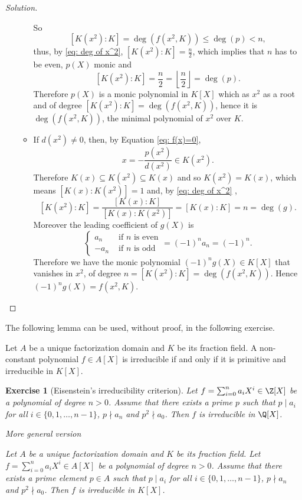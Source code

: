 \documentclass[a4paper,10pt,reqno]{amsart}
\newtheorem{ex}{Exercise}[section]
\newenvironment{sol}
  {\renewcommand\qedsymbol{$\blacksquare$}\begin{proof}[Solution]}
  {\end{proof}}
\begin{document}
\begin{sol}
\begin{enumerate}[label=(\roman*)]
\begin{itemize}
        So 
        \[
        [K(x^2):K]=\deg(f(x^2,K))\leq \deg(p)< n,
        \]
        thus, by \eqref{eq: deg of x^2}, $[K(x^2):K]=\frac{n}{2}$, which implies that $n$ has to be even, $p(X)$ monic and 
        \[
        [K(x^2):K]=\frac{n}{2}=\left\lfloor \frac{n}{2}\right\rfloor=\deg(p).
        \]
        Therefore $p(X)$ is a monic polynomial in $K[X]$
        which as $x^2$ as a root and of degree $[K(x^2):K]=\deg(f(x^2,K))$,
        hence it is $\deg(f(x^2,K))$,
        the minimal polynomial of $x^2$ over $K$.
        \item If $d(x^2)\neq0$, then, by Equation \eqref{eq: f(x)=0}, 
        \[
        x=-\frac{p(x^2)}{d(x^2)}\in K(x^2).
        \]
        Therefore $K(x)\subseteq K(x^2)\subseteq K(x)$ and so $K(x^2)=K(x)$,
        which means $[K(x):K(x^2)]=1$ and, by \eqref{eq: deg of x^2} ,
        \[
        [K(x^2):K]=\frac{[K(x):K]}{[K(x):K(x^2)]}=[K(x):K]=n=\deg(g).
        \]
        Moreover the leading coefficient of $g(X)$ is
        \[
        \begin{cases}
        a_n &\text{ if }n\text{ is even}\\
        -a_n&\text{ if }n\text{ is odd}
        \end{cases}=(-1)^na_n=(-1)^n .
        \]
        Therefore we have the monic polynomial  
        $(-1)^ng(X)\in K[X]$ that vanishes in $x^2$,
        of degree $n=[K(x^2):K]=\deg(f(x^2,K))$. Hence $(-1)^ng(X)=f(x^2,K)$.
    \end{itemize}
    \end{enumerate}
\end{sol}



The following lemma can be used, without proof, in the following exercise.

\begin{lem*}
    Let $A$ be a unique factorization domain and $K$ be its fraction field.
    A non-constant polynomial $f\in A[X]$ is irreducible if and only if it is primitive and irreducible in $K[X]$.
\end{lem*}

\begin{ex} [Eisenstein's irreducibility criterion]
    Let $f=\sum_{i=0}^n a_iX^i\in \Z[X]$ be a polynomial of degree $n>0$. 
    Assume that there exists a prime $p$ such that
    $p\mid a_i$ for all $i\in\{0,1,\dots,n-1\}$, $p\nmid a_n$ and
    $p^2\nmid a_0$. Then $f$ is irreducible in $\Q[X]$.

    \vspace{.5cm}
    
    \textit{More general version}
    
    Let $A$ be a unique factorization domain and $K$ be its fraction field.
    Let $f=\sum_{i=0}^n a_iX^i\in A[X]$ be a polynomial of degree $n>0$. 
    Assume that there exists a prime element $p\in A$ such that
    $p\mid a_i$ for all $i\in\{0,1,\dots,n-1\}$, $p\nmid a_n$ and
    $p^2\nmid a_0$. Then $f$ is irreducible in $K[X]$. 
\end{ex}
\end{document}
